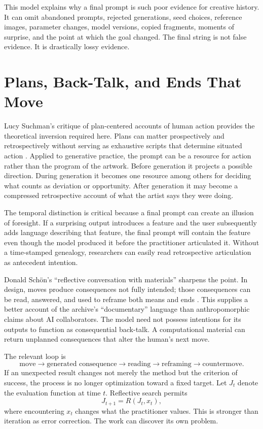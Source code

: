 \documentclass[11pt]{article}
\begin{document}
This model explains why a final prompt is such poor evidence for creative history. It can omit abandoned prompts, rejected generations, seed choices, reference images, parameter changes, model versions, copied fragments, moments of surprise, and the point at which the goal changed. The final string is not false evidence. It is drastically lossy evidence.

\section{Plans, Back-Talk, and Ends That Move}

Lucy Suchman's critique of plan-centered accounts of human action provides the theoretical inversion required here. Plans can matter prospectively and retrospectively without serving as exhaustive scripts that determine situated action \parencite{suchman2006reconfigurations}. Applied to generative practice, the prompt can be a resource for action rather than the program of the artwork. Before generation it projects a possible direction. During generation it becomes one resource among others for deciding what counts as deviation or opportunity. After generation it may become a compressed retrospective account of what the artist says they were doing.

The temporal distinction is critical because a final prompt can create an illusion of foresight. If a surprising output introduces a feature and the user subsequently adds language describing that feature, the final prompt will contain the feature even though the model produced it before the practitioner articulated it. Without a time-stamped genealogy, researchers can easily read retrospective articulation as antecedent intention.

Donald Schön's ``reflective conversation with materials'' sharpens the point. In design, moves produce consequences not fully intended; those consequences can be read, answered, and used to reframe both means and ends \parencite{schon1996reflective}. This supplies a better account of the archive's ``documentary'' language than anthropomorphic claims about AI collaborators. The model need not possess intentions for its outputs to function as consequential back-talk. A computational material can return unplanned consequences that alter the human's next move.

The relevant loop is
\[
\text{move} \rightarrow \text{generated consequence} \rightarrow \text{reading} \rightarrow \text{reframing} \rightarrow \text{countermove}.
\]
If an unexpected result changes not merely the method but the criterion of success, the process is no longer optimization toward a fixed target. Let $J_t$ denote the evaluation function at time $t$. Reflective search permits
\[
J_{t+1}=R(J_t,x_t),
\]
where encountering $x_t$ changes what the practitioner values. This is stronger than iteration as error correction. The work can discover its own problem.
\end{document}

